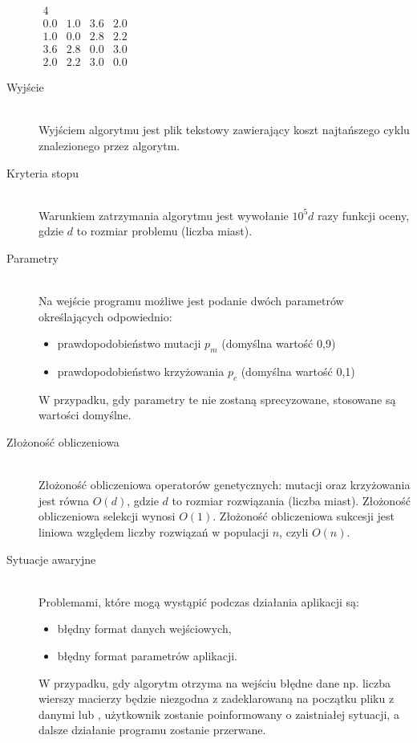 \documentclass[12pt, a4paper]{article}
\begin{document}
\begin{description}
\bigskip
$ 
\begin{array}{llll}
4 \\
0.0 & 1.0 & 3.6 & 2.0 \\
1.0 & 0.0 & 2.8 & 2.2 \\
3.6 & 2.8 & 0.0 & 3.0 \\
2.0 & 2.2 & 3.0 & 0.0
\end{array}
$
	\item[Wyjście] \hfill \\
	Wyjściem algorytmu jest plik tekstowy zawierający koszt najtańszego cyklu znalezionego przez algorytm.
	\item[Kryteria stopu] \hfill \\
	Warunkiem zatrzymania algorytmu jest wywołanie $10^5d$ razy funkcji oceny, gdzie $d$ to rozmiar problemu (liczba miast).
	\item[Parametry] \hfill \\
	Na wejście programu możliwe jest podanie dwóch parametrów określających odpowiednio:
		\begin{itemize}
			\item prawdopodobieństwo mutacji $p_m$ (domyślna wartość 0,9)
			\item prawdopodobieństwo krzyżowania $p_c$ (domyślna wartość 0,1)
		\end{itemize}
		W przypadku, gdy parametry te nie zostaną sprecyzowane, stosowane są wartości domyślne.
	\item[Złożoność obliczeniowa] \hfill \\
	Złożoność obliczeniowa operatorów genetycznych: mutacji oraz krzyżowania jest równa $O(d)$, 
gdzie $d$ to rozmiar rozwiązania (liczba miast). Złożoność obliczeniowa selekcji wynosi $O(1)$. Złożoność obliczeniowa
sukcesji jest liniowa względem liczby rozwiązań w populacji $n$, czyli $O(n)$. 
	\item[Sytuacje awaryjne] \hfill \\
Problemami, które mogą wystąpić podczas działania aplikacji są:
	\begin{itemize}
        \item błędny format danych wejściowych,
        \item błędny format parametrów aplikacji.
	\end{itemize}

W przypadku, gdy algorytm otrzyma na wejściu błędne dane np. liczba wierszy macierzy będzie niezgodna z zadeklarowaną na początku pliku z danymi lub , użytkownik zostanie poinformowany o zaistniałej sytuacji, a dalsze działanie programu zostanie przerwane.

\end{description}
\end{document}
